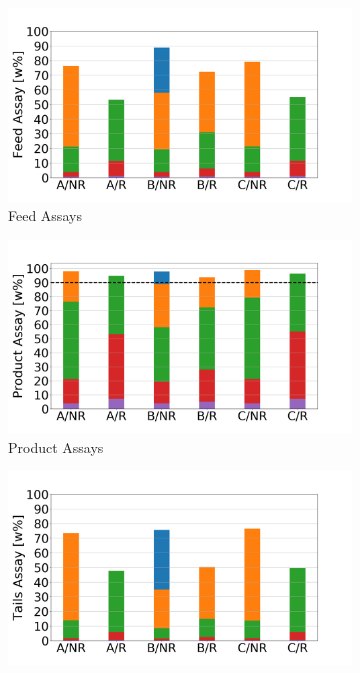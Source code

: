 \begin{figure}[h!]
    \centering
    \begin{subfigure}[t]{0.45\textwidth}
        \centering
        \includegraphics[width=\linewidth]{feed_assays}
        \caption{Feed Assays}
        \label{sfig:feed_assay}
    \end{subfigure}%
    \begin{subfigure}[t]{0.45\textwidth}
        \centering
        \includegraphics[width=\linewidth]{product_assays}
        \caption{Product Assays}
        \label{sfig:product_assay}
    \end{subfigure}
    \begin{subfigure}[t]{0.45\textwidth}
        \centering
        \includegraphics[width=\linewidth]{tails_assays}

\end{subfigure}
\end{figure}
